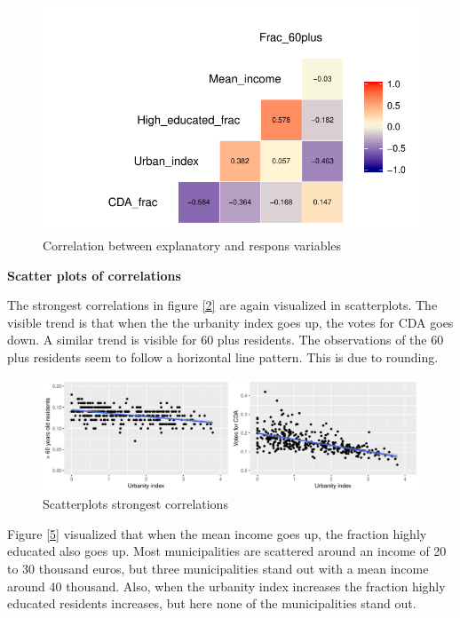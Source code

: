 \documentclass[11pt,]{article}
\begin{document}
\begin{figure}[H]

{\centering \includegraphics{Report_files/figure-latex/correlation_heatmap-1} 

}

\caption{\label{2}Correlation between explanatory and respons variables}\label{fig:correlation_heatmap}
\end{figure}

\textbf{Scatter plots of correlations }

The strongest correlations in figure \ref{2} are again visualized in
scatterplots. The visible trend is that when the the urbanity index goes
up, the votes for CDA goes down. A similar trend is visible for 60 plus
residents. The observations of the 60 plus residents seem to follow a
horizontal line pattern. This is due to rounding.

\begin{figure}[H]

{\centering \includegraphics{Report_files/figure-latex/unnamed-chunk-5-1} 

}

\caption{\label{3}Scatterplots strongest correlations}\label{fig:unnamed-chunk-5}
\end{figure}

Figure \ref{5} visualized that when the mean income goes up, the
fraction highly educated also goes up. Most municipalities are scattered
around an income of 20 to 30 thousand euros, but three municipalities
stand out with a mean income around 40 thousand. Also, when the urbanity
index increases the fraction highly educated residents increases, but
here none of the municipalities stand out.
\end{document}
